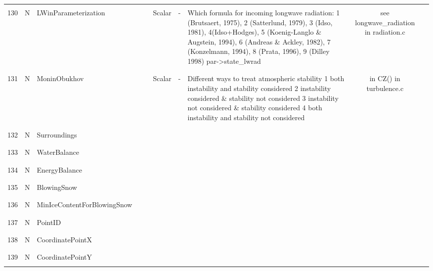\begin{longtable}{|c|c|l|c|c|c|c|p{}|c|p{}|}
&&&&&&&&&\\\hline%
&&&&&&&&&\\
130 & N & LWinParameterization & & & Scalar & - & \parbox[c]{\hsize}{Which formula for incoming longwave radiation:  1 (Brutsaert, 1975), 2 (Satterlund, 1979), 3 (Idso, 1981), 4(Idso+Hodges),  5 (Koenig-Langlo \& Augstein, 1994), 6 (Andreas \& Ackley, 1982), 7 (Konzelmann, 1994), 8 (Prata, 1996), 9 (Dilley 1998) par->state\_lwrad} & see longwave\_radiation in radiation.c & \\
&&&&&&&&&\\\hline%
&&&&&&&&&\\
131 & N & MoninObukhov & & & Scalar & - & \parbox[c]{\hsize}{Different ways to treat atmospheric stability 1 both instability and stability considered
2 instability considered \& stability not considered
3 instability not considered \& stability considered
4 both instability and stability not considered} & in CZ() in turbulence.c & \\
&&&&&&&&&\\\hline%
&&&&&&&&&\\
132 & N & Surroundings & & & & & & & \\
&&&&&&&&&\\\hline%
&&&&&&&&&\\
133 & N & WaterBalance & & & & & & & \\
&&&&&&&&&\\\hline%
&&&&&&&&&\\
134 & N & EnergyBalance & & & & & & & \\
&&&&&&&&&\\\hline%
&&&&&&&&&\\
135 & N & BlowingSnow & & & & & & & \\
&&&&&&&&&\\\hline%
&&&&&&&&&\\
136 & N & MinIceContentForBlowingSnow & & & & & & & \\
&&&&&&&&&\\\hline%
&&&&&&&&&\\
137 & N & PointID & & & & & & & \\
&&&&&&&&&\\\hline%
&&&&&&&&&\\
138 & N & CoordinatePointX & & & & & & & \\
&&&&&&&&&\\\hline%
&&&&&&&&&\\
139 & N & CoordinatePointY & & & & & & & \\
&&&&&&&&&\\\hline%

\end{longtable}
